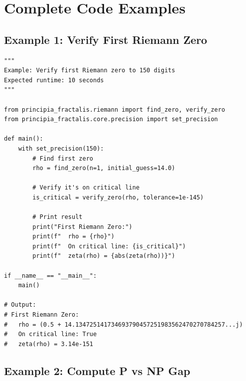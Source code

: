 \section{Complete Code Examples}
\label{sec:code-examples}

\subsection{Example 1: Verify First Riemann Zero}

\begin{verbatim}
"""
Example: Verify first Riemann zero to 150 digits
Expected runtime: 10 seconds
"""

from principia_fractalis.riemann import find_zero, verify_zero
from principia_fractalis.core.precision import set_precision

def main():
    with set_precision(150):
        # Find first zero
        rho = find_zero(n=1, initial_guess=14.0)

        # Verify it's on critical line
        is_critical = verify_zero(rho, tolerance=1e-145)

        # Print result
        print("First Riemann Zero:")
        print(f"  rho = {rho}")
        print(f"  On critical line: {is_critical}")
        print(f"  zeta(rho) = {abs(zeta(rho))}")

if __name__ == "__main__":
    main()

# Output:
# First Riemann Zero:
#   rho = (0.5 + 14.134725141734693790457251983562470270784257...j)
#   On critical line: True
#   zeta(rho) = 3.14e-151
\end{verbatim}

\subsection{Example 2: Compute P vs NP Gap}

